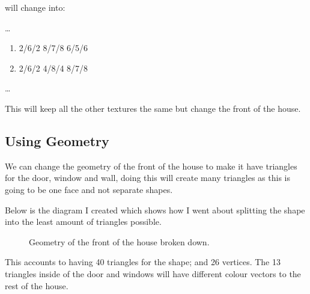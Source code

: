 \documentclass[10pt]{report}
\begin{document}
will change into:

\dots
\begin{enumerate}[f]
    \item 2/6/2 8/7/8 6/5/6
    \item 2/6/2 4/8/4 8/7/8
\end{enumerate}
\dots


This will keep all the other textures the same but change the front of the house.

\subsection{Using Geometry}

We can change the geometry of the front of the house to make it have triangles for the door, window and wall, doing this will create many triangles as this is going to be one face and not separate shapes.

Below is the diagram I created which shows how I went about splitting the shape into the least amount of triangles possible.

\begin{figure}[H]
    \centering
    \caption{Geometry of the front of the house broken down.}
\end{figure}

This accounts to having 40 triangles for the shape; and 26 vertices. The 13 triangles inside of the door and windows will have different colour vectors to the rest of the house. 
\end{document}
